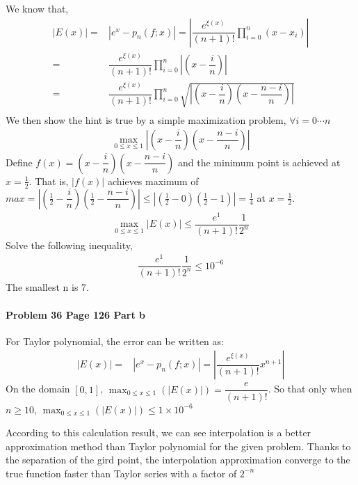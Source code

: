 \documentclass[paper=a4, fontsize=11pt]{scrartcl} %
\numberwithin{equation}{section} %
\numberwithin{figure}{section} %
\numberwithin{table}{section} %
\begin{document}
We know that,
\begin{align*}
	|E(x)| = &|e^x-p_n(f;x)| = |\dfrac{e^{\xi(x)}}{(n+1)!}\prod_{i=0}^{n}(x-x_i)|\\
		 = &\dfrac{e^{\xi(x)}}{(n+1)!}\prod_{i=0}^{n}|(x-\dfrac{i}{n})|\\
 		 = &\dfrac{e^{\xi(x)}}{(n+1)!}\prod_{i=0}^{n}\sqrt{|(x-\dfrac{i}{n})(x-\dfrac{n-i}{n})|}\\
\end{align*}
We then show the hint is true by a simple maximization problem, $ \forall i=0\cdots n $
\begin{align*}
	\max_{0\leq x\leq 1} |(x-\dfrac{i}{n})(x-\dfrac{n-i}{n})|	
\end{align*}
Define $ f(x)=(x-\dfrac{i}{n})(x-\dfrac{n-i}{n}) $ and the minimum point is achieved at $ x=\frac{1}{2} $. That is, $ |f(x)| $ achieves maximum of $ max = |(\frac{1}{2}-\dfrac{i}{n})(\frac{1}{2}-\dfrac{n-i}{n})|\leq |(\frac{1}{2}-0)(\frac{1}{2}-1)|=\frac{1}{4} $ at $ x=\frac{1}{2} $.
\begin{align*}
	\max_{0\leq x\leq 1}|E(x)|\leq \dfrac{e^{1}}{(n+1)!}\dfrac{1}{2^n}
\end{align*}
Solve the following inequality,
\begin{align*}
	\dfrac{e^{1}}{(n+1)!}\dfrac{1}{2^n}\leq 10^{-6}
\end{align*}
The smallest n is 7.

\paragraph{\textbf{Problem 36 Page 126 Part b}}
For Taylor polynomial, the error can be written as:
\begin{align*}
	|E(x)| = &|e^x-p_n(f;x)| = |\dfrac{e^{\xi(x)}}{(n+1)!}x^{n+1}|
\end{align*}
On the domain $[0,1]$, $\displaystyle\max_{0\le x\le1}(|E(x)|) = \dfrac{e}{(n+1)!}$. So that only when $n \ge 10$, $\displaystyle\max_{0\le x\le1}(|E(x)|) \le 1\times 10^{-6}$

According to this calculation result, we can see interpolation is a better approximation method than Taylor polynomial for the given problem. Thanks to the separation of the gird point, the interpolation approximation converge to the true function faster than Taylor series with a factor of $2^{-n}$
\newpage
\end{document}
